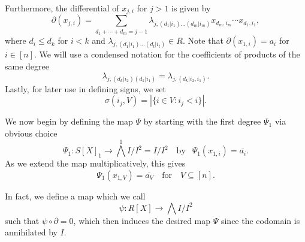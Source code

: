 \documentclass{amsart}
\theoremstyle{definition}
\theoremstyle{remark}
\begin{document}
Furthermore, the differential of $x_{j,i}$ for $j>1$ is given by 
\[
\partial(x_{j,i})= \sum_{d_1+\cdots+d_m=j-1} \lambda_{j,(d_1|i_1)\ldots(d_m|i_m)}x_{d_m,i_m}\cdots x_{d_1,i_1},
\] 
where  $d_i \leq d_k$ for $i < k$ and $\lambda_{j,(d_1|i_1)\ldots(d_t|i_t)} \in R$. Note that $\partial(x_{1,i})=a_i$ for $i \in [n]$. We will use a condensed notation for the coefficients of products of the same degree
\[
\lambda_{j,(d_k|i_2)(d_k|i_1)} = \lambda_{j,(d_k|i_2,i_1)}.
\]
Lastly, for later use in defining signs, we set 
\[\sigma(i_j,V)=|\{i \in V : i_j< i\}|.\]

We now begin by defining the map $\Psi$ by starting with the first degree $\Psi_1$ via obvious choice  
\[
\Psi_1: S[X]_1 \to \bigwedge^1 I/I^2= I/I^2 \ \ \ 
{\textrm{ by }} \ \ 
\Psi_1(x_{1,i})=\overline{a_i}.
\]
As we extend the map multiplicatively, this gives
\[
\Psi_1(x_{1,V})=\overline{a_V} \quad \text{for} \quad V\subseteq [n].
\]



In fact, we define a map which we call \[\psi :R[ X ] \to \bigwedge I/I^2\] such that $\psi \circ \partial =0$, which then induces the desired map $\Psi$ since the codomain is annihilated by $I$. 
\end{document}
